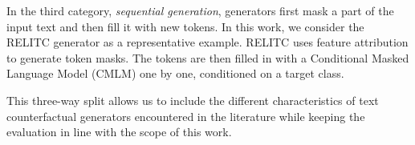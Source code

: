 \documentclass[11pt]{article}
\begin{document}
In the third category, \textit{sequential generation}, generators first mask a part of the input text and then fill it with new tokens. In this work, we consider the RELITC generator \cite{betti_relevance-based_2023} as a representative example. RELITC uses feature attribution to generate token masks. The tokens are then filled in with a Conditional Masked Language Model (CMLM) one by one, conditioned on a target class.

This three-way split allows us to include the different characteristics of text counterfactual generators encountered in the literature while keeping the evaluation in line with the scope of this work.

\begin{table*}[!htb]
    \centering
    \caption{Averages and standard deviations of the quantitative metrics calculated for counterfactual explanations of texts in the test set. A perfect result for the perplexity ratio metric is thought to be $1$ \cite{bhan_tigtec_2023}.}
    \label{tab:quantitative-results}
\end{table*}
\end{document}
